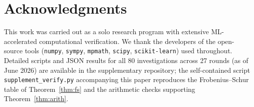 \documentclass[11pt,a4paper]{amsart}
\theoremstyle{definition}
\theoremstyle{remark}
\begin{document}
\section*{Acknowledgments}

This work was carried out as a solo research program with extensive
ML-accelerated computational verification. We thank the developers of
the open-source tools (\texttt{numpy}, \texttt{sympy}, \texttt{mpmath},
\texttt{scipy}, \texttt{scikit-learn}) used throughout. Detailed scripts
and JSON results for all 80 investigations across 27 rounds (as of June 2026)
are available in the supplementary repository; the self-contained script
\texttt{supplement\_verify.py} accompanying this paper reproduces the
Frobenius--Schur table of Theorem~\ref{thm:fs} and the arithmetic checks
supporting Theorem~\ref{thm:arith}.



\end{document}
